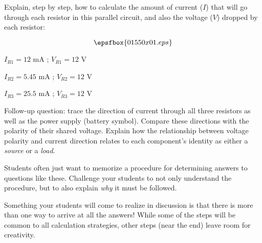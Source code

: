 

Explain, step by step, how to calculate the amount of current ($I$) that will go through each resistor in this parallel circuit, and also the voltage ($V$) dropped by each resistor:

$$\epsfbox{01550x01.eps}$$







\medskip
\item {} $I_{R1} = 12$ mA ; $V_{R1} = 12$ V
\item {} $I_{R2} = 5.45$ mA ; $V_{R2} = 12$ V
\item {} $I_{R3} = 25.5$ mA ; $V_{R3} = 12$ V
\medskip

\vskip 10pt

Follow-up question: trace the direction of current through all three resistors as well as the power supply (battery symbol).  Compare these directions with the polarity of their shared voltage.  Explain how the relationship between voltage polarity and current direction relates to each component's identity as either a {\it source} or a {\it load}.







Students often just want to memorize a procedure for determining answers to questions like these.  Challenge your students to not only understand the procedure, but to also explain {\it why} it must be followed.

Something your students will come to realize in discussion is that there is more than one way to arrive at all the answers!  While some of the steps will be common to all calculation strategies, other steps (near the end) leave room for creativity.




